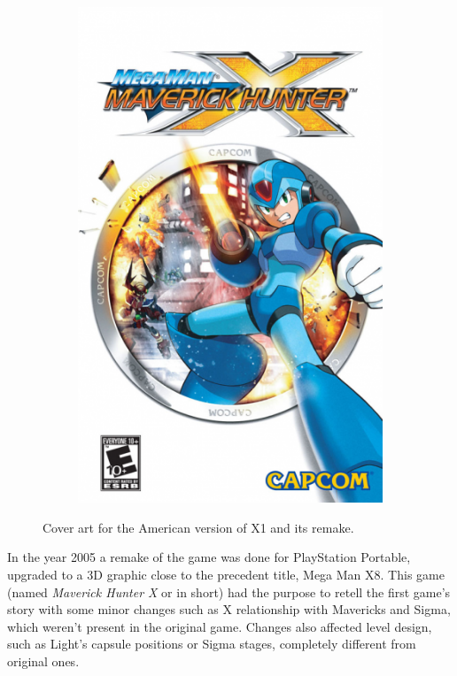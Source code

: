 \begin{figure}[htp]
\begin{subfigure}{0.4\linewidth}
		\includegraphics[width=\linewidth]{figures/X1/mmxmh.png}
	\end{subfigure}
	\caption{Cover art for the American version of X1 and its remake.}
\end{figure}

In the year 2005 a remake of the game was done for PlayStation Portable, upgraded to a 3D graphic close to the precedent title, Mega Man X8. This game (named \textit{Maverick Hunter X }or \mhx in short) had the purpose to retell the first game's story with some minor changes such as X relationship with Mavericks and Sigma, which weren't present in the original game. Changes also affected level design, such as Light's capsule positions or Sigma stages, completely different from original ones.

